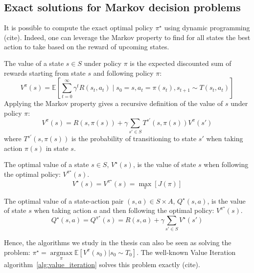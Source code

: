 \subsection{Exact solutions for Markov decision problems}
It is possible to compute the exact optimal policy $\pi^\star$ using dynamic programming (cite). Indeed, one can leverage the Markov property to find for all states the best action to take based on the reward of upcoming states.
\begin{definition} The value of a state $s\in S$ under policy $\pi$ is the expected discounted sum of rewards starting from state $s$ and following policy $\pi$:
    $$V^\pi(s) = \mathbb{E}\left[\sum_{t=0}^{\infty} \gamma^t R(s_t, a_t) \mid s_0 = s, a_t = \pi(s_t), s_{t+1} \sim T(s_t, a_t)\right]$$
    Applying the Markov property gives a recursive definition of the value of $s$ under policy $\pi$:
    $$V^\pi(s) = R(s,\pi(s)) + \gamma \sum_{s' \in S} T^{s'}(s,\pi(s))V^\pi(s')$$
    where $T^{s'}(s,\pi(s))$ is the probability of transitioning to state $s'$ when taking action $\pi(s)$ in state $s$.
\end{definition}
\begin{definition} The optimal value of a state $s\in S$, $V^\star(s)$, is the value of state $s$ when following the optimal policy: $V^{\pi^{\star}}(s)$.
    $$V^{\star}(s) = V^{\pi^{\star}}(s) = \underset{\pi}{\max}\left[J(\pi)\right]$$
\end{definition}
\begin{definition} The optimal value of a state-action pair $(s,a)\in S\times A$, $Q^\star(s,a)$, is the value of state $s$ when taking action $a$ and then following the optimal policy: $V^{\pi^{\star}}(s)$.
    $$Q^{\star}(s,a) = Q^{\pi^{\star}}(s) = R(s, a) + \gamma\sum_{s'\in S}V^{\star}(s')$$
\end{definition}

Hence, the algorithms we study in the thesis can also be seen as solving the problem: $\pi^{\star} = \underset{\pi}{\operatorname{argmax}}\mathbb{E}\left[V^{\pi}(s_0)|s_0\sim T_0 \right]$. The well-known Value Iteration algorithm~\ref{alg:value_iteration} solves this problem exactly (cite). 

